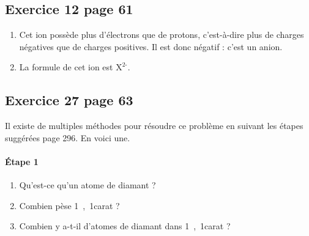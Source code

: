 \documentclass[12pt,a4paper]{article}
\begin{document}
\subsection*{Exercice 12 page 61}

\begin{enumerate}
\item Cet ion possède plus d'électrons que de protons, c'est-à-dire plus de charges négatives que de charges positives.
Il est donc négatif : c'est un anion.

\item La formule de cet ion est $\text{X}^\text{2-}$.
\end{enumerate}

\subsection*{Exercice 27 page 63}

Il existe de multiples méthodes pour résoudre ce problème en suivant les étapes suggérées page 296.
En voici une.

\paragraph{Étape 1}
\begin{enumerate}
\item \label{quest:atomediamant} Qu'est-ce qu'un \og atome de diamant \fg{} ?
\item \label{quest:carat} Combien pèse \unit{1{,}1}{carat} ?
\item \label{quest:nbatomediamant} Combien y a-t-il d'\og atomes de diamant \fg{} dans \unit{1{,}1}{carat} ?
\end{enumerate}
\end{document}
